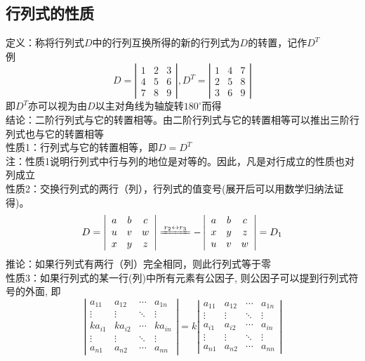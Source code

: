 \subsection{行列式的性质}
{\color{red}定义：}称将行列式$D$中的行列互换所得的新的行列式为$D$的转置，记作$D^{T}$\\
例
$$
D=\left|
\begin{array}{ccc}
    1 & 2 & 3 \\
    4 & 5 & 6 \\
    7 & 8 & 9
\end{array}
\right|,
D^{T}=\left|
\begin{array}{ccc}
    1 & 4 & 7 \\
    2 & 5 & 8 \\
    3 & 6 & 9
\end{array}
\right|
$$
即$D^{T}$亦可以视为由$D$以主对角线为轴旋转$180^{\circ}$而得\\
{\color{green}结论：}二阶行列式与它的转置相等。由二阶行列式与它的转置相等可以推出三阶行列式也与它的转置相等 \\
{\color{blue}性质1：}行列式与它的转置相等，即$D=D^{T}$\\
{\color{red}注：}性质1说明行列式中行与列的地位是对等的。因此，凡是对行成立的性质也对列成立\\
{\color{blue}性质2：}交换行列式的两行（列），行列式的值变号(展开后可以用数学归纳法证得)。\\
$$
D=
\left|
\begin{array}{ccc}
    a & b & c \\
    u & v & w \\
    x & y & z
\end{array}\right|
\xlongequal{r_{2}\leftrightarrow r_{3}}
-\left|
\begin{array}{ccc}
    a & b & c \\
    x & y & z \\
    u & v & w
\end{array}\right|=D_{1}
$$
{\color{blue}推论：}如果行列式有两行（列）完全相同，则此行列式等于零 \\
{\color{blue}性质3：}如果行列式的某一行(列)中所有元素有公因子, 则公因子可以提到行列式符号的外面, 即
$$
\left|
\begin{array}{cccc}
    a_{11} & a_{12} & \cdots & a_{1n} \\
    \vdots & \vdots & \ddots & \vdots \\
    ka_{i1} & ka_{i2} & \cdots & ka_{in} \\
    \vdots & \vdots & \ddots & \vdots \\
    a_{n1} & a_{n2} & \cdots & a_{nn} 
\end{array}\right|=
k\left|
\begin{array}{cccc}
    a_{11} & a_{12} & \cdots & a_{1n} \\
    \vdots & \vdots & \ddots & \vdots \\
    a_{i1} & a_{i2} & \cdots & a_{in} \\
    \vdots & \vdots & \ddots & \vdots \\
    a_{n1} & a_{n2} & \cdots & a_{nn} 
\end{array}\right|
$$
